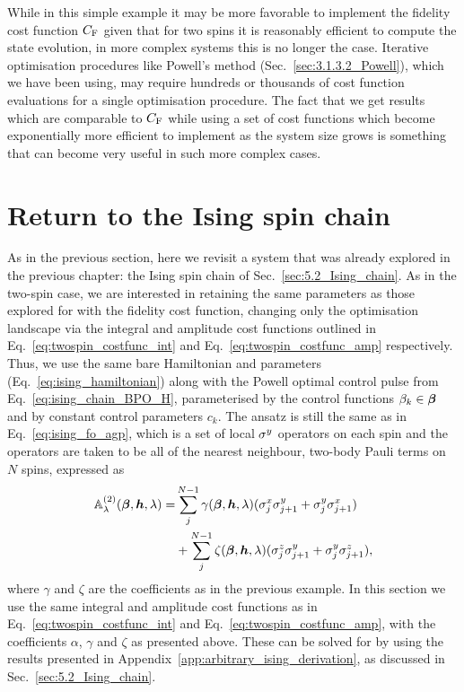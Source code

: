 While in this simple example it may be more favorable to implement the fidelity cost function $C_{\rm F}$ given that for two spins it is reasonably efficient to compute the state evolution, in more complex systems this is no longer the case. Iterative optimisation procedures like Powell's method (Sec.~\ref{sec:3.1.3.2_Powell}), which we have been using, may require hundreds or thousands of cost function evaluations for a single optimisation procedure. The fact that we get results which are comparable to $C_{\rm F}$ while using a set of cost functions which become exponentially more efficient to implement as the system size grows is something that can become very useful in such more complex cases.

\section{Return to the Ising spin chain}\label{sec:7.2_ising_ho_lcd}

As in the previous section, here we revisit a system that was already explored in the previous chapter: the Ising spin chain of Sec.~\ref{sec:5.2_Ising_chain}. As in the two-spin case, we are interested in retaining the same parameters as those explored for  with the fidelity cost function, changing only the optimisation landscape via the integral and amplitude cost functions outlined in Eq.~\eqref{eq:twospin_costfunc_int} and Eq.~\eqref{eq:twospin_costfunc_amp} respectively. Thus, we use the same bare Hamiltonian and parameters (Eq.~\eqref{eq:ising_hamiltonian}) along with the Powell optimal control pulse from Eq.~\eqref{eq:ising_chain_BPO_H}, parameterised by the control functions $\beta_k \in \boldsymbol{\beta}$ and by constant control parameters $c_k$. The   ansatz is still the same as in Eq.~\eqref{eq:ising_fo_agp}, which is a set of local $\sigma^y$ operators on each spin and the  operators are taken to be all of the nearest neighbour, two-body Pauli terms on $N$ spins, expressed as
\begin{equation}\label{eq:ising_so_lcd_terms}
    \begin{aligned}
        \mathbb{A}_{\lambda}^{(2)}(\boldsymbol{\beta}, \boldsymbol{h}, \lambda) = & \sum_j^{N-1} \gamma(\boldsymbol{\beta}, \boldsymbol{h}, \lambda) (\sigma^x_j\sigma^y_{j+1} + \sigma^y_j\sigma^x_{j+1}) \\
        &+ \sum_j^{N-1} \zeta(\boldsymbol{\beta}, \boldsymbol{h}, \lambda) (\sigma^z_j\sigma^y_{j+1} + \sigma^y_j\sigma^z_{j+1}),
    \end{aligned}
\end{equation}
where $\gamma$ and $\zeta$ are the   coefficients as in the previous example. In this section we use the same integral and amplitude cost functions as in Eq.~\eqref{eq:twospin_costfunc_int} and Eq.~\eqref{eq:twospin_costfunc_amp}, with the coefficients $\alpha$, $\gamma$ and $\zeta$ as presented above. These can be solved for by using the results presented in Appendix~\ref{app:arbitrary_ising_derivation}, as discussed in Sec.~\ref{sec:5.2_Ising_chain}.

